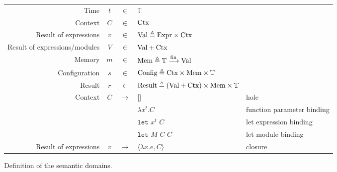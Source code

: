 \documentclass[acmsmall,screen,review]{acmart}
\theoremstyle{definition}
\newcommand*{\vbar}{|}
\newcommand*{\Expr}{\text{Expr}}
\newcommand*{\Time}{\mathbb{T}}
\newcommand*{\Ctx}[1]{\text{Ctx}\vphantom{#1}}
\newcommand*{\Value}[1]{\text{Val}\vphantom{#1}}
\newcommand*{\Mem}[1]{\text{Mem}\vphantom{#1}}
\newcommand*{\mem}{m}
\newcommand*{\Config}[1]{\text{Config}\vphantom{#1}}
\newcommand*{\Result}[1]{\text{Result}\vphantom{#1}}
\newcommand*{\fin}[2]{{#1}\xrightarrow{\text{fin}}{#2}}
\newcommand*{\Let}{\mathtt{let}}
\begin{document}
\begin{figure}[htb]
  \centering
  \footnotesize
  \begin{tabular}{rccll}
    Time                          & $t$    & $\in$         & $\Time$                                                                                                          \\
    Context                       & $C$    & $\in$         & $\Ctx\Time$                                                                                                      \\
    Result of expressions         & $v$    & $\in$         & $\Value\Time \triangleq \Expr\times\Ctx\Time$                                                                    \\
    Result of expressions/modules & $V$    & $\in$         & $\Value{\Time}+\Ctx{\Time}$                                                                                      \\
    Memory                        & $\mem$ & $\in$         & $\Mem{\Time} \triangleq \fin{\Time}{\Value{\Time}}$                                                              \\
    Configuration                 & $s$    & $\in$         & $\Config{\Time} \triangleq \Ctx{\Time}\times\Mem{\Time}\times\Time$                                              \\
    Result                        & $r$    & $\in$         & $\Result{\Time} \triangleq (\Value{\Time}+\Ctx{\Time})\times\Mem{\Time}\times\Time$                              \\
    Context                       & $C$    & $\rightarrow$ & []                                                                                  & hole                       \\
                                  &        & $\vbar$       & $\lambda x^{t}.C$                                                                   & function parameter binding \\
                                  &        & $\vbar$       & $\Let$ $x^{t}$ $C$                                                                  & let expression binding     \\
                                  &        & $\vbar$       & $\Let$ $M$ $C$ $C$                                                                  & let module binding         \\
    Result of expressions         & $v$    & $\rightarrow$ & $\langle \lambda x.e, C \rangle$                                                    & closure
  \end{tabular}
  \caption{Definition of the semantic domains.}
\end{figure}
\end{document}
